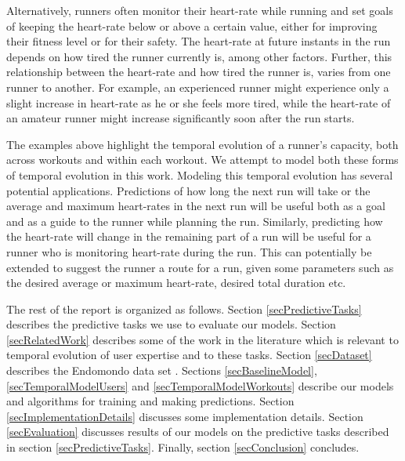 \documentclass{acm_proc_article-sp}
\begin{document}
Alternatively, runners often monitor their heart-rate while running and set goals of keeping the heart-rate below or above a certain value, either for improving their fitness level or for their safety. The heart-rate at future instants in the run depends on how tired the runner currently is, among other factors. Further, this relationship between the heart-rate and how tired the runner is, varies from one runner to another. For example, an experienced runner might experience only a slight increase in heart-rate as he or she feels more tired, while the heart-rate of an amateur runner might increase significantly soon after the run starts.

The examples above highlight the temporal evolution of a runner's capacity, both across workouts and within each workout. We attempt to model both these forms of temporal evolution in this work. Modeling this temporal evolution has several potential applications. Predictions of how long the next run will take or the average and maximum heart-rates in the next run will be useful both as a goal and as a guide to the runner while planning the run. Similarly, predicting how the heart-rate will change in the remaining part of a run will be useful for a runner who is monitoring heart-rate during the run. This can potentially be extended to suggest the runner a route for a run, given some parameters such as the desired average or maximum heart-rate, desired total duration etc.

The rest of the report is organized as follows. Section \ref{secPredictiveTasks} describes the predictive tasks we use to evaluate our models. Section \ref{secRelatedWork} describes some of the work in the literature which is relevant to temporal evolution of user expertise and to these tasks. Section \ref{secDataset} describes the Endomondo data set \cite{endomondo}. Sections \ref{secBaselineModel}, \ref{secTemporalModelUsers} and \ref{secTemporalModelWorkouts} describe our models and algorithms for training and making predictions. Section \ref{secImplementationDetails} discusses some implementation details. Section \ref{secEvaluation} discusses results of our models on the predictive tasks described in section \ref{secPredictiveTasks}. Finally, section \ref{secConclusion} concludes.
\end{document}
